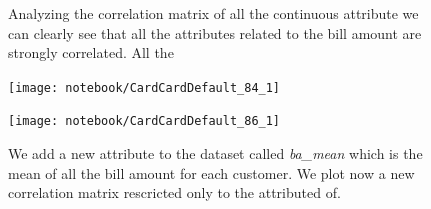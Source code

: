 \begin{figure}[h]
  \begin{minipage}[h]{.60\textwidth}
  Analyzing the correlation matrix of all the continuous attribute we can clearly see that all the attributes related to the bill amount are strongly correlated.
  All the 
  
  \end{minipage}
  \begin{minipage}[h]{.40\textwidth}
    \texttt{[image: notebook/CardCardDefault\_84\_1]}
  \end{minipage}
\end{figure}


\begin{figure}[h]
  \begin{minipage}[h]{.40\textwidth}
    \texttt{[image: notebook/CardCardDefault\_86\_1]}
  \end{minipage}
  \begin{minipage}[h]{.60\textwidth}
  We add a new attribute to the dataset called \textit{ba\_mean} which is the mean of all the bill amount for each customer.
  We plot now a new correlation matrix rescricted only to the attributed of.
  \end{minipage}
\end{figure}
